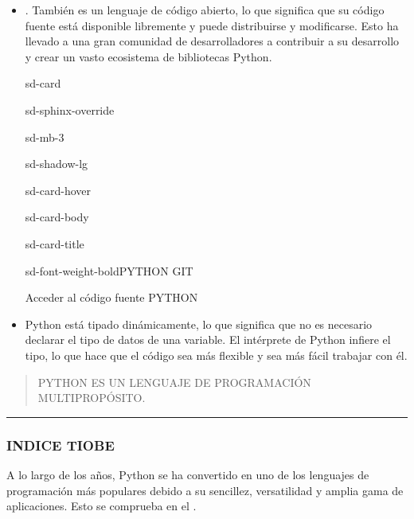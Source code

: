 \documentclass[letterpaper,10pt,spanish]{sphinxmanual}
\begin{document}
\begin{itemize}
\item {} 
\sphinxAtStartPar
{}. También es un lenguaje de código abierto, lo que significa que su código fuente está disponible libremente y puede distribuirse y modificarse. Esto ha llevado a una gran comunidad de desarrolladores a contribuir a su desarrollo y crear un vasto ecosistema de bibliotecas Python.

\begin{sphinxuseclass}{sd-card}
\begin{sphinxuseclass}{sd-sphinx-override}
\begin{sphinxuseclass}{sd-mb-3}
\begin{sphinxuseclass}{sd-shadow-lg}
\begin{sphinxuseclass}{sd-card-hover}
\begin{sphinxuseclass}{sd-card-body}
\begin{sphinxuseclass}{sd-card-title}
\begin{sphinxuseclass}{sd-font-weight-bold}PYTHON GIT
\end{sphinxuseclass}
\end{sphinxuseclass}
\sphinxAtStartPar
Acceder al código fuente PYTHON

\end{sphinxuseclass}
\end{sphinxuseclass}
\end{sphinxuseclass}
\end{sphinxuseclass}
\end{sphinxuseclass}
\end{sphinxuseclass}
\item {} 
\sphinxAtStartPar
{} Python está tipado dinámicamente, lo que significa que no es necesario declarar el tipo de datos de una variable. El intérprete de Python infiere el tipo, lo que hace que el código sea más flexible y sea más fácil trabajar con él.

\end{itemize}
\begin{quote}

\sphinxAtStartPar
PYTHON ES UN LENGUAJE DE PROGRAMACIÓN MULTI\sphinxhyphen{}PROPÓSITO.
\end{quote}


\bigskip\hrule\bigskip



\subsubsection{INDICE TIOBE}
\label{\detokenize{1_guias/10programacion/G1024:indice-tiobe}}
\sphinxAtStartPar
A lo largo de los años, Python se ha convertido en uno de los lenguajes de programación más populares debido a su sencillez, versatilidad y amplia gama de aplicaciones. Esto se comprueba en el .
\end{document}
